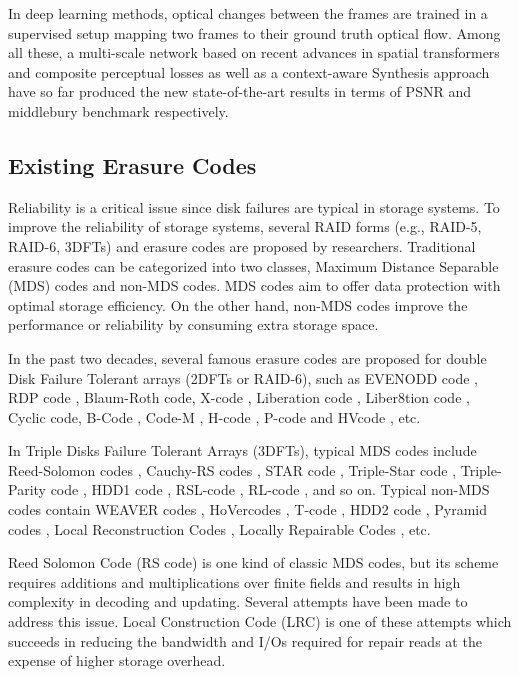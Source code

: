 \documentclass[sigconf]{acmart}
\begin{document}
In deep learning methods, optical changes between the frames are trained in a supervised setup mapping two frames to their ground truth optical flow. Among all these, a multi-scale network\cite{van2017frame} based on recent advances in spatial transformers and composite perceptual losses as well as a context-aware Synthesis approach\cite{niklaus2018context} have so far produced the new state-of-the-art results in terms of PSNR and middlebury benchmark respectively.


\subsection{Existing Erasure Codes}\label{existEC}

Reliability is a critical issue since disk failures are typical in storage systems. To improve the reliability of storage systems, several RAID forms (e.g., RAID-5, RAID-6, 3DFTs) and erasure codes are proposed by researchers.  Traditional erasure codes can be categorized into two classes, Maximum Distance Separable (MDS) codes and non-MDS codes. MDS codes aim to offer data protection with optimal storage efficiency. On the other hand, non-MDS codes improve the performance or reliability by consuming extra storage space.

In the past two decades, several famous erasure codes are proposed for double Disk Failure Tolerant arrays (2DFTs or RAID-6), such as EVENODD code \cite{EVENODD}, RDP code \cite{RDP}, Blaum-Roth code\cite{BlaumRoth}, X-code \cite{XCode}, Liberation code \cite{Liberation}, Liber8tion code \cite{Liber8tion}, Cyclic \cite {Cyclic} code, B-Code \cite{BCode}, Code-M \cite{Code-M}, H-code \cite{hcode}, P-code \cite{PCode} and HVcode \cite{HVCode}, etc.

In Triple Disks Failure Tolerant Arrays (3DFTs), typical MDS codes include Reed-Solomon codes \cite{RS}, Cauchy-RS codes \cite{CRS}, STAR code \cite{STAR}, Triple-Star code \cite{TripleStar}, Triple-Parity code \cite{TPtech}, HDD1 code \cite{HDD}, RSL-code \cite{RSL}, RL-code \cite{RL}, and so on. Typical non-MDS codes contain WEAVER codes \cite{WEAVER}, HoVercodes \cite{HoVer}, T-code \cite{TCode}, HDD2 code \cite{HDD}, Pyramid codes \cite{Pyramid}, Local Reconstruction Codes \cite{LRC}, Locally Repairable Codes \cite{XORing}, etc.


Reed Solomon Code \cite{RS} (RS code) is one kind of classic MDS codes, but its scheme requires additions and multiplications over finite fields and results in high complexity in decoding and updating. Several attempts have been made to address this issue. Local Construction Code (LRC) \cite{LRC} is one of these attempts which succeeds in reducing the bandwidth and I/Os required for repair reads at the expense of higher storage overhead.
\end{document}
